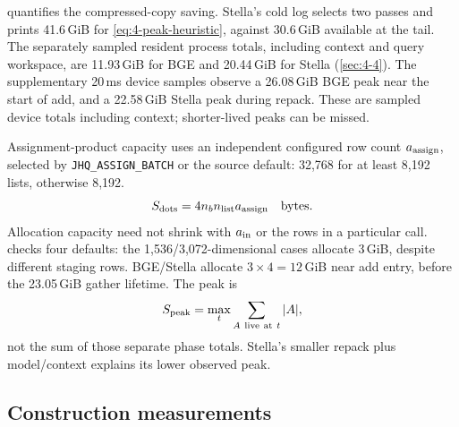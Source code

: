  quantifies the compressed-copy saving. Stella's
cold log selects two passes and prints 41.6\,GiB for
\cref{eq:4-peak-heuristic}, against 30.6\,GiB available at the tail.
The separately sampled resident process totals, including context and
query workspace, are 11.93\,GiB for BGE and 20.44\,GiB for Stella
(\cref{sec:4-4}). The supplementary 20\,ms device samples observe a 26.08\,GiB BGE peak
near the start of add, and a 22.58\,GiB Stella peak during repack.
These are sampled device totals including context; shorter-lived peaks
can be missed.

Assignment-product capacity uses an independent configured row count
$a_{\rm assign}$, selected by \texttt{JHQ\_ASSIGN\_BATCH} or the source
default: 32,768 for at least 8,192 lists, otherwise 8,192.
\begin{equation}
 S_{\rm dots}=4n_b n_{\rm list}a_{\rm assign}\quad\text{bytes}.
 \label{eq:4-assignment-scratch}
\end{equation}
Allocation capacity need not shrink with $a_{\rm in}$ or the rows in a
particular call.  checks four defaults: the 1,536/3,072-dimensional
cases allocate 3\,GiB, despite different staging rows. BGE/Stella allocate $3\times4=12$\,GiB near add entry, before the 23.05\,GiB gather lifetime. The peak is
\[
 S_{\rm peak}=\max_t\sum_{A\ {\rm live\ at}\ t}|A|,
\]
not the sum of those separate phase totals. Stella's smaller repack plus model/context explains its lower observed peak.

\subsection{Construction measurements}

